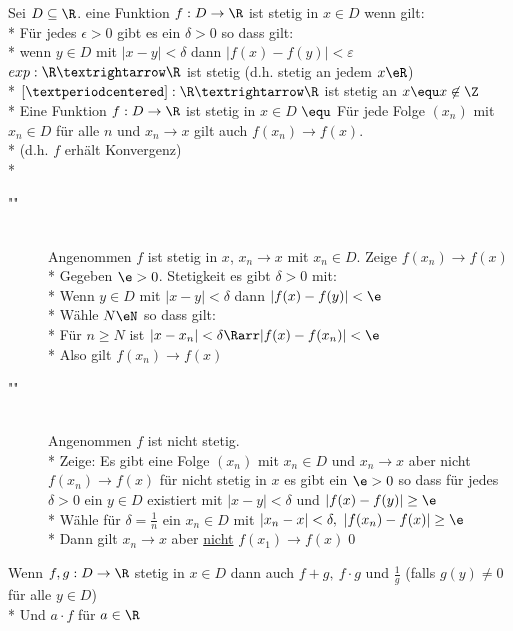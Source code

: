 \wdh
Sei $D \subseteq \R$. eine Funktion $f: D \to \R$ ist stetig in $x \in D$ wenn gilt:\\*
Für jedes $\epsilon > 0$ gibt es ein $\delta > 0$ so dass gilt: \\*
wenn $y \in D$ mit $|x - y| < \delta$ dann $|f(x) - f(y)| < ε$
\bsp
$exp:\R→\R$ ist stetig (d.h. stetig an jedem $x\eR$)\\*
$[·]:\R→\R$ ist stetig an $x \equ x\not\in\Z$\\*
Eine Funktion $f: D \to \R$ ist stetig in $x \in D$ $\equ$ Für jede Folge $(x_n)$ mit $x_n \in D$ für alle $n$ und $x_n \to x$ gilt auch $f(x_n) \to f(x)$.\\*
(d.h. $f$ erhält Konvergenz)\\*
\bew
\begin{description}
\item["\Rarr"]{\hfill\\Angenommen $f$ ist stetig in $x$, $x_n→x$ mit $x_n\in D$. Zeige $f(x_n)→f(x)$\\*
Gegeben $\e>0$. Stetigkeit \Rarr{} es gibt $\delta>0$ mit:\\*
Wenn $y\in D$ mit $|x-y|<\delta$ dann $|f(x)-f(y)|<\e$\\*
Wähle $N\eN$ so dass gilt:\\*
Für $n\geq N$ ist $|x-x_n|<\delta \Rarr |f(x)-f(x_n)|<\e$\\*
Also gilt $f(x_n)→f(x)$}
\item["\Larr"]{\hfill\\Angenommen $f$ ist nicht stetig.\\*
Zeige: Es gibt eine Folge $(x_n)$ mit $x_n\in D$ und $x_n→x$ aber nicht $f(x_n)→f(x)$ für nicht stetig in $x$ \Rarr{} es gibt ein $\e>0$ so dass für jedes $\delta>0$ ein $y\in D$ existiert mit $|x-y|<\delta$ und $|f(x)-f(y)|\geq \e$\\*
Wähle für $\delta=\frac{1}{n}$ ein $x_n\in D$ mit $|x_n-x|<\delta,\ |f(x_n)-f(x)|\geq\e$\\*
Dann gilt $x_n→x$ aber \ul{nicht} $f(x_1)→f(x)$\qed}
\end{description}
%
\wdh
{}
Wenn $f, g: D \to \R$ stetig in $x \in D$ dann auch $f + g,\ f · g$ und $\frac{1}{g}$ (falls $g(y) \neq 0$ für alle $y \in D$) \\*
Und $a \cdot f$ für $a \in \R$

